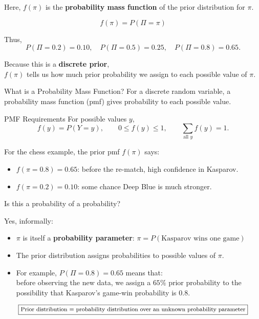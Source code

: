 \documentclass[12pt]{beamer}
\begin{document}
\begin{frame}{}
Here, \(f(\pi)\) is the \textbf{probability mass function} of the prior distribution for \(\pi\).

\[
f(\pi) = P(\Pi = \pi)
\]

Thus,
\[
P(\Pi = 0.2) = 0.10,
\quad
P(\Pi = 0.5) = 0.25,
\quad
P(\Pi = 0.8) = 0.65.
\]

Because this is a \textbf{discrete prior},\\
\(f(\pi)\) tells us how much prior probability we assign to each possible value of \(\pi\).
\end{frame}

\begin{frame}{}
\begin{block}{What is a Probability Mass Function?}
For a discrete random variable, a \alert{probability mass function (pmf)} gives probability to each possible value.

\begin{block}{PMF Requirements}
For possible values $y$,
\[
f(y) = P(Y=y), \qquad 0 \leq f(y) \leq 1, \qquad \sum_{\text{all }y} f(y)=1.
\]
\end{block}

For the chess example, the prior pmf $f(\pi)$ says:
\begin{itemize}
\item $f(\pi=0.8)=0.65$: before the re-match, high confidence in Kasparov.
\item $f(\pi=0.2)=0.10$: some chance Deep Blue is much stronger.
\end{itemize}
\end{block}
\end{frame}

\begin{frame}{}
\small
\begin{block}{Is this a probability of a probability?}

Yes, informally:

\begin{itemize}
\item \(\pi\) is itself a \textbf{probability parameter}: $\pi = P(\text{Kasparov wins one game})$
\item The prior distribution assigns probabilities to possible values of \(\pi\).
\item For example, $P(\Pi = 0.8) = 0.65$ means that:\\
before observing the new data, we assign a \(65\%\) prior probability to the possibility that Kasparov's game-win probability is \(0.8\).
\end{itemize}

\[
\boxed{
\footnotesize
\text{Prior distribution = probability distribution over an unknown probability parameter}}
\]

\end{block}
\end{frame}
\end{document}

